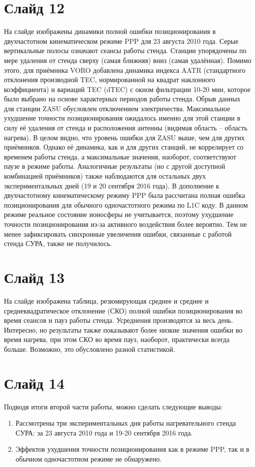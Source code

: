 \documentclass[a4paper,14pt]{extarticle}
\begin{document}
\section*{Слайд 12}
На слайде изображены динамики полной ошибки позиционирования в двухчастотном кинематическом режиме PPP для 23 августа 2010 года.
Серые вертикальные полосы означают сеансы работы стенда.
Станции упорядочены по мере удаления от стенда сверху (самая ближняя) вниз (самая удалённая).
Помимо этого, для приёмника VORO добавлена динамика индекса AATR (стандартного отклонения производной TEC, нормированной на квадрат наклонного коэффициента) и вариаций TEC (dTEC) с окном фильтрации 10-20 мин, которое было выбрано на основе характерных периодов работы стенда. 
Обрыв данных для станции ZASU обусловлен отключением электричества.
Максимальное ухудшение точности позиционирования ожидалось именно для этой станции в силу её удаления от стенда и расположения антенны (видимая область -- область нагрева).
В целом видно, что уровень ошибки для ZASU выше, чем для других приёмников.
Однако её динамика, как и для других станций, не коррелирует со временем работы стенда, а максимальные значения, наоборот, соответствуют паузе в режиме работы.
Аналогичные результаты (но с другой доступной комбинацией приёмников) также наблюдаются для остальных двух экспериментальных дней (19 и 20 сентября 2016 года).
В дополнение к двухчастотному кинематическому режиму PPP была рассчитана полная ошибка позиционирования для обычного одночастотного режима по L1C коду.
В данном режиме реальное состояние ионосферы не учитывается, поэтому ухудшение точности позиционирования из-за активного воздействия более вероятно.
Тем не менее зафиксировать синхронные увеличения ошибки, связанные с работой стенда СУРА, также не получилось.

\section*{Слайд 13}
На слайде изображена таблица, резюмирующая среднее и среднее и среднеквадратическое отклонение (СКО) полной ошибки позиционирования во время сеансов и пауз работы стенда.
Усреднения производятся за весь день.
Интересно, но результаты также показывают более низкие значения ошибки во время нагрева, при этом СКО во время пауз, наоборот, практически всегда больше.
Возможно, это обусловлено разной статистикой.

\section*{Слайд 14}
Подводя итоги второй части работы, можно сделать следующие выводы:
\begin{enumerate}[leftmargin=*]
\item Рассмотрены три экспериментальных дня работы нагревательного стенда СУРА: за 23 августа 2010 года и 19-20 сентября 2016 года.
\item Эффектов ухудшения точности позиционирования как в режиме PPP, так и в обычном одночастотном режиме не обнаружено.
\end{enumerate}
\end{document}
